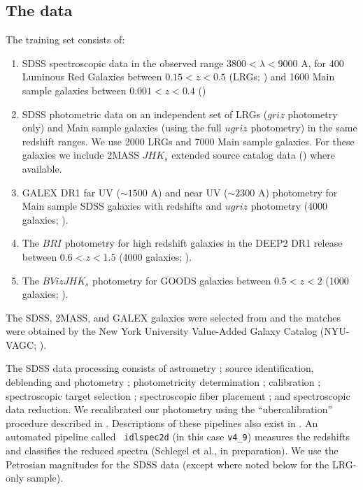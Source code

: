 \documentclass[10pt,preprint]{aastex}
\renewcommand{\AA}{A}
\begin{document}
\subsection{The data}
\label{data}

The training set consists of:
\begin{enumerate}
\item SDSS spectroscopic data in the observed range $3800 < \lambda <
9000$ \AA, for 400 Luminous Red Galaxies between $0.15 < z < 0.5$ (LRGs;
\citealt{eisenstein01a}) and 1600 Main sample galaxies between $0.001
< z < 0.4$ (\citealt{strauss02a})
\item SDSS photometric data on an independent set of LRGs ($griz$
photometry only) and Main sample galaxies (using the full $ugriz$
photometry) in the same redshift ranges. We use 2000 LRGs and 7000
Main sample galaxies.  For these galaxies we include 2MASS $JHK_s$
extended source catalog data (\citealt{jarrett00a}) where available.
\item GALEX DR1 far UV ($\sim 1500$ \AA) and near UV ($\sim 2300$ \AA)
photometry for Main sample SDSS galaxies with redshifts and $ugriz$
photometry (4000 galaxies; \citealt{martin05a}).
\item The $BRI$ photometry for high redshift galaxies in the DEEP2 
DR1 release between $0.6 < z < 1.5$ (4000
galaxies; \citealt{davis03a, faber03a}).
\item The $BVizJHK_s$ photometry for GOODS galaxies between $0.5 < z < 2$ (1000
galaxies; \citealt{giavalisco04a}).
\end{enumerate}
The SDSS, 2MASS, and GALEX galaxies were selected from and the matches
were obtained by the New York University Value-Added Galaxy Catalog
(NYU-VAGC;
\citealt{blanton05a}).  

The SDSS data processing consists of astrometry \citep{pier03a};
source identification, deblending and photometry \citep{lupton01a};
photometricity determination \citep{hogg01a}; calibration
\citep{fukugita96a,smith02a}; spectroscopic target selection
\citep{eisenstein01a,strauss02a,richards02a}; spectroscopic fiber
placement \citep{blanton03a}; and spectroscopic data reduction.  We
recalibrated our photometry using the ``ubercalibration'' procedure
described in \citet{blanton05a}.  Descriptions of these pipelines also
exist in \citet{stoughton02a}.  An automated pipeline called {\tt
idlspec2d} (in this case {\tt v4\_9}) measures the redshifts and
classifies the reduced spectra (Schlegel et al., in preparation). We
use the Petrosian magnitudes for the SDSS data (except where noted
below for the LRG-only sample).
\end{document}
